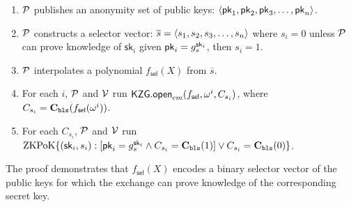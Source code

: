 
\begin{Protocol*}[t!]
\begin{mdframed}
\begin{enumerate}
\item $\mathcal{P}$ publishes an anonymity set of public keys: $\left \langle \mathsf{pk}_1,\mathsf{pk}_2,\mathsf{pk}_3,\dots,\mathsf{pk}_n \right \rangle$.
\item $\mathcal{P}$ constructs a selector vector: $\overline{s}=\left \langle s_1,s_2,s_3,\ldots,s_n \right \rangle$ where $s_i=0$ unless $\mathcal{P}$ can prove knowledge of $\mathsf{sk}_i$ given $\mathsf{pk}_i=g_s^{\mathsf{sk}_i}$, then $s_i=1$.
\item $\mathcal{P}$ interpolates a polynomial $f_\mathsf{sel}(X)$ from $\overline{s}$.
\item For each $i$, $\mathcal{P}$ and $\mathcal{V}$ run $\mathsf{KZG.open}_{cm}(f_\mathsf{sel}, \omega^i, C_{s_i})$, where $C_{s_i}=\textbf{C}_\texttt{bls}(f_\mathsf{sel}(\omega^i))$.
\item For each $C_{s_i}$, $\mathcal{P}$ and $\mathcal{V}$ run $\mathrm{ZKPoK} \{ (\mathsf{sk}_i,s_i) :  [\mathsf{pk}_i=g_s^{\mathsf{sk}_i} \land C_{s_i}=\textbf{C}_\texttt{bls}(1)  ] \lor C_{s_i}=\textbf{C}_\texttt{bls}(0) \}$.
\end{enumerate}
\end{mdframed}
\caption{The \bootstrap proof demonstrates that $f_\mathsf{sel}(X)$ encodes a binary selector vector of the public keys for which the exchange can prove knowledge of the corresponding secret key. \label{alg:boot}}
\end{Protocol*}
